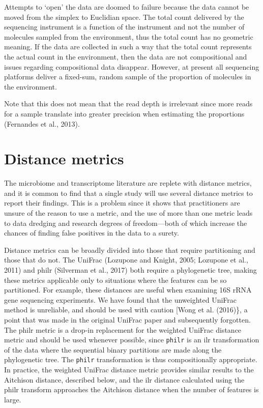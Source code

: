 \documentclass[twocolumn]{article}
\begin{document}
Attempts to `open' the data are doomed to failure because the data
cannot be moved from the simplex to Euclidian space. The total count
delivered by the sequencing instrument is a function of the instrument
and not the number of molecules sampled from the environment, thus the
total count has no geometric meaning. If the data are collected in such
a way that the total count represents the actual count in the
environment, then the data are not compositional and issues regarding
compositional data disappear. However, at present all sequencing
platforms deliver a fixed-sum, random sample of the proportion of
molecules in the environment.

Note that this does not mean that the read depth is irrelevant since
more reads for a sample translate into greater precision when estimating
the proportions (Fernandes et al., 2013).

\section{Distance metrics}

The microbiome and transcriptome literature are replete with distance
metrics, and it is common to find that a single study will use several
distance metrics to report their findings. This is a problem since it
shows that practitioners are unsure of the reason to use a metric, and
the use of more than one metric leads to data dredging and research
degrees of freedom---both of which increase the chances of finding false
positives in the data to a surety.

Distance metrics can be broadly divided into those that require
partitioning and those that do not. The UniFrac (Lozupone and Knight,
2005; Lozupone et al., 2011) and philr (Silverman et al., 2017) both
require a phylogenetic tree, making these metrics applicable only to
situations where the features can be so partitioned. For example, these
distances are useful when examining 16S rRNA gene sequencing
experiments. We have found that the unweighted UniFrac method is
unreliable, and should be used with caution {[}Wong et al. (2016)\}, a
point that was made in the original UniFrac paper and subsequently
forgotten. The philr metric is a drop-in replacement for the weighted
UniFrac distance metric and should be used whenever possible, since
\texttt{philr} is an ilr transformation of the data where the sequential
binary partitions are made along the phylogenetic tree. The
\texttt{philr} transformation is thus compositionally appropriate. In
practice, the weighted UniFrac distance metric provides similar results
to the Aitchison distance, described below, and the ilr distance
calculated using the philr transform approaches the Aitchison distance
when the number of features is large.
\end{document}
